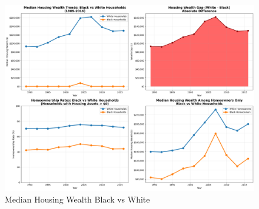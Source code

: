\documentclass[
  12pt]{article}
\begin{document}
\begin{figure}[H]

{\centering \includegraphics{Images/3.png}

}

\caption{Median Housing Wealth Black vs White}

\end{figure}%
\end{document}
